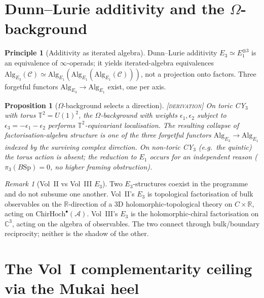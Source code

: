 \documentclass[11pt]{amsart}
\providecommand{\C}{\mathbb{C}}
\providecommand{\R}{\mathbb{R}}
\providecommand{\cA}{\mathcal{A}}
\providecommand{\cC}{\mathcal{C}}
\providecommand{\ChirHoch}{\mathrm{ChirHoch}}
\providecommand{\Eone}{E_1}
\providecommand{\Ethree}{E_3}
\providecommand{\ClaimStatusDerivation}{\textsc{[derivation]}}
\theoremstyle{plain}
\newtheorem{proposition}[theorem]{Proposition}
\theoremstyle{definition}
\newtheorem{principle}[theorem]{Principle}
\theoremstyle{remark}
\newtheorem{remark}[theorem]{Remark}
\begin{document}
\section{Dunn--Lurie additivity and the $\Omega$-background}

\begin{principle}[Additivity as iterated algebra]
\label{prin:dunn}
Dunn--Lurie additivity $\Ethree\simeq\Eone^{\otimes 3}$ is an
equivalence of $\infty$-operads; it yields iterated-algebra
equivalences $\mathrm{Alg}_{\Ethree}(\cC)\simeq
\mathrm{Alg}_{\Eone}(\mathrm{Alg}_{\Eone}(\mathrm{Alg}_{\Eone}(\cC)))$,
not a projection onto factors. Three forgetful functors
$\mathrm{Alg}_{\Ethree}\to\mathrm{Alg}_{\Eone}$ exist, one per axis.
\end{principle}

\begin{proposition}[$\Omega$-background selects a direction]
\label{prop:omega-selects}
\ClaimStatusDerivation{}\;
On toric CY$_3$ with torus $\mathbb{T}^2=U(1)^2$, the
$\Omega$-background with weights $\epsilon_1,\epsilon_2$ subject to
$\epsilon_3=-\epsilon_1-\epsilon_2$ performs $\mathbb{T}^2$-equivariant
localisation. The resulting collapse of
factorisation-algebra structure is one of the three forgetful functors
$\mathrm{Alg}_{\Ethree}\to\mathrm{Alg}_{\Eone}$ indexed by the surviving
complex direction. On non-toric CY$_3$ (e.g.\ the quintic) the torus
action is absent; the reduction to $\Eone$ occurs for an independent
reason ($\pi_3(B\mathrm{Sp})=0$, no higher framing obstruction).
\end{proposition}

\begin{remark}[Vol~II vs Vol~III $\Ethree$]
Two $\Ethree$-structures coexist in the programme and do not
subsume one another. Vol~II's $\Ethree$ is topological factorisation
of bulk observables on the $\R$-direction of a 3D holomorphic-topological
theory on $C\times\R$, acting on $\ChirHoch^\bullet(\cA)$. Vol~III's
$\Ethree$ is the holomorphic-chiral factorisation on $\C^3$, acting on
the algebra of observables. The two connect through bulk/boundary
reciprocity; neither is the shadow of the other.
\end{remark}

\section{The Vol~I complementarity ceiling via the Mukai heel}
\end{document}
